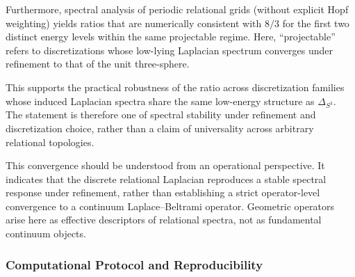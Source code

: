     Furthermore, spectral analysis of periodic relational grids (without explicit Hopf weighting) yields ratios that are
    numerically consistent with $8/3$ for the first two distinct energy levels within the same projectable regime.
    Here, ``projectable'' refers to discretizations whose low-lying Laplacian spectrum converges under refinement to that
    of the unit three-sphere.

    This supports the practical robustness of the ratio across discretization families whose induced Laplacian spectra
    share the same low-energy structure as $\Delta_{S^3}$.
    The statement is therefore one of spectral stability under refinement and discretization choice, rather than a claim
    of universality across arbitrary relational topologies.

    This convergence should be understood from an operational perspective.
    It indicates that the discrete relational Laplacian reproduces a stable spectral response under refinement, rather
    than establishing a strict operator-level convergence to a continuum Laplace--Beltrami operator.
    Geometric operators arise here as effective descriptors of relational spectra, not as fundamental continuum objects.

  \subsubsection*{Computational Protocol and Reproducibility}
    \label{subsec:computational_protocol}

